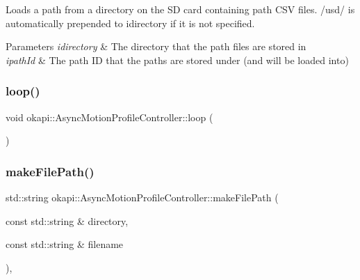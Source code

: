 Loads a path from a directory on the SD card containing path C\+SV files. /usd/ is automatically prepended to idirectory if it is not specified.


\begin{DoxyParams}{Parameters}
{\em idirectory} & The directory that the path files are stored in \\
\hline
{\em ipath\+Id} & The path ID that the paths are stored under (and will be loaded into) \\
\hline
\end{DoxyParams}
\mbox{\label{classokapi_1_1AsyncMotionProfileController_a8a41524c4cc3352e2eda15dfe3e7ad27}} 
\subsubsection{\texorpdfstring{loop()}{loop()}}
{\footnotesize\ttfamily void okapi\+::\+Async\+Motion\+Profile\+Controller\+::loop (\begin{DoxyParamCaption}{ }\end{DoxyParamCaption})\hspace{0.3cm}{\ttfamily [protected]}}

\mbox{\label{classokapi_1_1AsyncMotionProfileController_a3380054b3feb2679fe5b919095959826}} 
\subsubsection{\texorpdfstring{makeFilePath()}{makeFilePath()}}
{\footnotesize\ttfamily std\+::string okapi\+::\+Async\+Motion\+Profile\+Controller\+::make\+File\+Path (\begin{DoxyParamCaption}\item[{const std\+::string \&}]{directory,  }\item[{const std\+::string \&}]{filename }\end{DoxyParamCaption})\hspace{0.3cm}{\ttfamily [static]}, {\ttfamily [protected]}}

